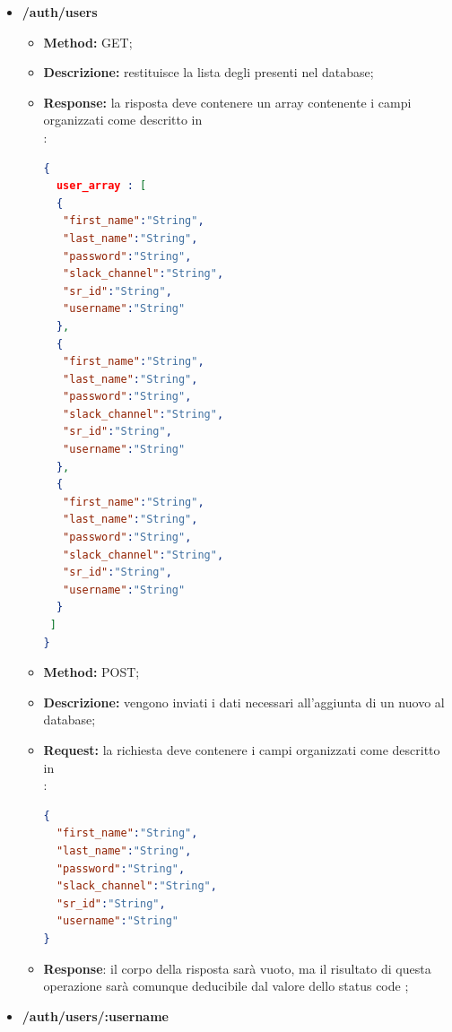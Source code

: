 \begin{itemize}
\item \textbf{/auth/users}\\
\begin{itemize}
\item \textbf{Method:} GET;
\item \textbf{Descrizione:} restituisce la lista degli  presenti nel database;
\item \textbf{Response:} la risposta deve contenere un array contenente i campi organizzati come descritto in \\:
\begin{lstlisting}[language=json,firstnumber=1]
{
  user_array : [
  {
   "first_name":"String",
   "last_name":"String",
   "password":"String",
   "slack_channel":"String",
   "sr_id":"String",
   "username":"String"
  },
  {
   "first_name":"String",
   "last_name":"String",
   "password":"String",
   "slack_channel":"String",
   "sr_id":"String",
   "username":"String"
  },
  {
   "first_name":"String",
   "last_name":"String",
   "password":"String",
   "slack_channel":"String",
   "sr_id":"String",
   "username":"String"
  }
 ]
}
\end{lstlisting}
\end{itemize}

\begin{itemize}
\item \textbf{Method:} POST;
\item \textbf{Descrizione:} vengono inviati i dati necessari all'aggiunta di un nuovo  al database;
\item \textbf{Request:} la richiesta deve contenere i campi organizzati come descritto in\\ :
\begin{lstlisting}[language=json,firstnumber=1]
{
  "first_name":"String",
  "last_name":"String",
  "password":"String",
  "slack_channel":"String",
  "sr_id":"String",
  "username":"String"
}
\end{lstlisting}
\item \textbf{Response}: il corpo della risposta sarà vuoto, ma il risultato di questa operazione sarà comunque deducibile dal valore dello status code ;
\end{itemize}

\item \textbf{/auth/users/:username}\\


\end{itemize}
